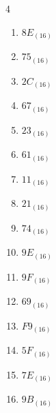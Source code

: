 \begin{multicols}{4}
\begin{enumerate}
  \item $8E_{(16)}$

        \phantom{$=142$}

  \item $75_{(16)}$

        \phantom{$=117$}

  \item $2C_{(16)}$

        \phantom{$=44$}

  \item $67_{(16)}$

        \phantom{$=103$}

\columnbreak %

  \item $23_{(16)}$

        \phantom{$=35$}

  \item $61_{(16)}$

        \phantom{$=97$}

  \item $11_{(16)}$

        \phantom{$=17$}

  \item $21_{(16)}$

        \phantom{$=33$}

  \item $74_{(16)}$

        \phantom{$=116$}

  \item $9E_{(16)}$

        \phantom{$=158$}

  \item $9F_{(16)}$

        \phantom{$=159$}

  \item $69_{(16)}$

        \phantom{$=105$}

  \item $F9_{(16)}$

        \phantom{$=249$}

  \item $5F_{(16)}$

        \phantom{$=95$}

  \item $7E_{(16)}$

        \phantom{$=126$}

  \item $9B_{(16)}$


\end{enumerate}
\end{multicols}
